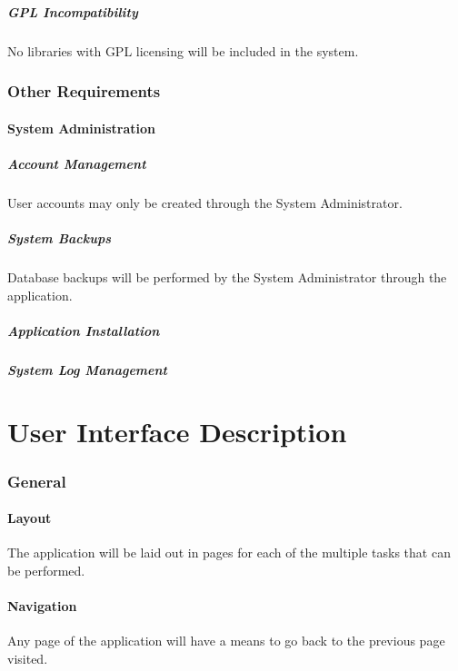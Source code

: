 \documentclass{article}
\begin{document}
\subsubsection{GPL Incompatibility}
No libraries with GPL licensing will be included in the system.

\section{Other Requirements}
\subsection{System Administration}
\subsubsection{Account Management}
User accounts may only be created through the System Administrator.
\subsubsection{System Backups}
Database backups will be performed by the System Administrator
through the application.
\subsubsection{Application Installation}
\subsubsection{System Log Management}

\part{User Interface Description}

\section{General}
\subsection{Layout}
The application will be laid out in pages for each of the multiple tasks that
can be performed.
\subsection{Navigation}
Any page of the application will have a means to go back to the previous
page visited.
\end{document}
